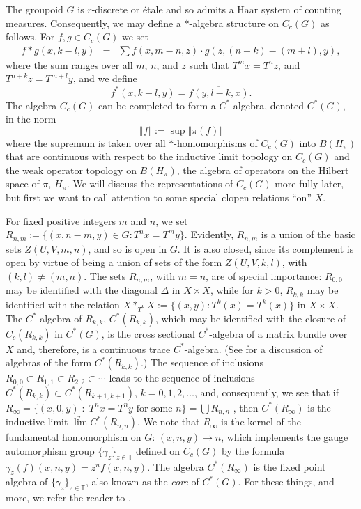 \documentclass{amsproc}
\theoremstyle{plain}
\theoremstyle{definition}
\theoremstyle{definition}
\theoremstyle{remark}
\theoremstyle{plain}
\begin{document}
The groupoid $G$ is $r$-discrete or \'{e}tale and so admits a Haar
system of counting measures. Consequently, we may define a $*$-algebra
structure on $C_{c}(G)$ as follows. For $f,g\in C_{c}(G)$ we
set\begin{eqnarray*}
f\ast g(x,k-l,y) & = & \sum f(x,m-n,z)\cdot g(z,(n+k)-(m+l),y),\end{eqnarray*}
 where the sum ranges over all $m$, $n$, and $z$ such that $T^{m}x=T^{n}z$,
and $T^{n+k}z=T^{m+l}y$, and we define \[
f^{*}(x,k-l,y)=\overline{f(y,l-k,x)}.\]
The algebra $C_{c}(G)$ can be completed to form a $C^{*}$-algebra,
denoted $C^{\ast}(G)$, in the norm\[
\Vert f\Vert:=\sup\Vert\pi(f)\Vert\]
where the supremum is taken over all $*$-homomorphisms of $C_{c}(G)$
into $B(H_{\pi})$ that are continuous with respect to the inductive
limit topology on $C_{c}(G)$ and the weak operator topology on $B(H_{\pi})$,
the algebra of operators on the Hilbert space of $\pi$, $H_{\pi}$.
We will discuss the representations of $C_{c}(G)$ more fully later,
but first we want to call attention to some special clopen relations
{}``on'' $X$. 

For fixed positive integers $m$ and $n$, we set $R_{n,m}:=\{(x,n-m,y)\in
G:T^{n}x=T^{m}y\}.$
Evidently, $R_{n,m}$ is a union of the basic sets $Z(U,V,m,n)$,
and so is open in $G$. It is also closed, since its complement is
open by virtue of being a union of sets of the form $Z(U,V,k,l)$,
with $(k,l)\ne(m,n)$. The sets $R_{n,m}$, with $m=n$, are of special
importance: $R_{0,0}$ may be identified with the diagonal $\Delta$
in $X\times X$, while for $k>0$, $R_{k,k}$ may be identified with
the relation $X\ast_{T^{k}}X:=\{(x,y):T^{k}(x)=T^{k}(x)\}$ in $X\times X$.
The $C^{*}$-algebra of $R_{k,k}$, $C^{*}(R_{k,k})$, which may be
identified with the closure of $C_{c}(R_{k,k})$ in $C^{*}(G)$, is
the cross sectional $C^{*}$-algebra of a matrix bundle over $X$
and, therefore, is a continuous trace $C^{*}$-algebra. (See \cite{aK85}
for a discussion of algebras of the form $C^{*}(R_{k,k})$.) The sequence
of inclusions $R_{0,0}\subset R_{1,1}\subset R_{2,2}\subset\cdots$
leads to the sequence of inclusions $C^{*}(R_{k,k})\subset C^{*}(R_{k+1,k+1})$,
$k=0,1,2,\ldots$, and, consequently, we see that if $R_{\infty}=\{(x,0,y)\;:\;
T^{n}x=T^{n}y\mbox{ for some }n\}=\bigcup R_{n,n}$
, then $ $$C^{\ast}(R_{\infty})$ is the inductive limit
$\underrightarrow{\lim}C^{\ast}(R_{n,n})$.
We note that $R_{\infty}$ is the kernel of the fundamental homomorphism
on $G$: $(x,n,y)\rightarrow n$, which implements the gauge automorphism
group $\{\gamma_{z}\}_{z\in\mathbb{T}}$ defined on $C_{c}(G)$ by
the formula $\gamma_{z}(f)(x,n,y)=z^{n}f(x,n,y)$. The algebra
$C^{*}(R_{\infty})$
is the fixed point algebra of $\{\gamma_{z}\}_{z\in\mathbb{T}}$,
also known as the \emph{core} of $C^{*}(G)$. For these things, and
more, we refer the reader to \cite{DKM01,jR00}.
\end{document}
